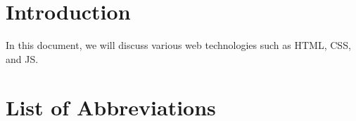 \documentclass{article}
\begin{document}


\section{Introduction}

In this document, we will discuss various web technologies such as \ac{HTML}, \ac{CSS}, and \ac{JS}.

\section{List of Abbreviations}
\end{document}
